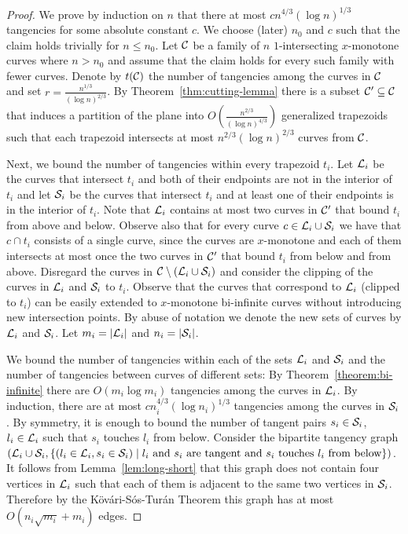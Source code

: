 \documentclass[11pt]{article}
\theoremstyle{definition}
\def\L{{\cal L}}
\def\C{{\cal C}}
\def\S{{\cal S}}
\begin{document}
\begin{proof}
We prove by induction on $n$ that there at most $c n^{4/3} (\log n)^{1/3}$ tangencies for some absolute constant $c$. 
We choose (later) $n_0$ and $c$ such that the claim holds trivially for $n \le n_0$.
Let $\C$ be a family of $n$ $1$-intersecting $x$-monotone curves where $n > n_0$ and assume that the claim holds for every such family with fewer curves.
Denote by $t(\C)$ the number of tangencies among the curves in $\C$
and set $r=\frac{n^{1/3}}{(\log n)^{2/3}}$.
By Theorem~\ref{thm:cutting-lemma} there is a subset $\C' \subseteq \C$ that induces a partition of the plane into $O\left(\frac{n^{2/3}}{(\log n)^{4/3}}\right)$ generalized trapezoids such that each trapezoid intersects at most $n^{2/3} (\log n)^{2/3}$ curves from $\C$.

Next, we bound the number of tangencies within every trapezoid $t_i$.
Let $\L_i$ be the curves that intersect $t_i$ and both of their endpoints are not in the interior of $t_i$ and let $\S_i$ be the curves that intersect $t_i$ and at least one of their endpoints is in the interior of $t_i$.
Note that $\L_i$ contains at most two curves in $\C'$ that bound $t_i$ from above and below.
Observe also that for every curve $c \in \L_i \cup \S_i$ we have that $c \cap t_i$ consists of a single curve, since the curves are $x$-monotone and each of them intersects at most once the two curves in $\C'$ that bound $t_i$ from below and from above.
Disregard the curves in $\C \setminus (\L_i \cup \S_i)$ and
consider the clipping of the curves in $\L_i$ and $\S_i$ to $t_i$. 
Observe that the curves that correspond to $\L_i$ (clipped to $t_i$) can be easily extended to $x$-monotone bi-infinite curves without introducing new intersection points.
By abuse of notation we denote the new sets of curves by $\L_i$ and $\S_i$.
Let $m_i = |\L_i|$ and $n_i = |\S_i|$.

We bound the number of tangencies within each of the sets $\L_i$ and $\S_i$ and the number of tangencies between curves of different sets:
By Theorem~\ref{theorem:bi-infinite} there are $O(m_i \log m_i)$ tangencies among the curves in $\L_i$.
By induction, there are at most $c n_i^{4/3} (\log n_i)^{1/3}$ tangencies among the curves in $\S_i$. 
By symmetry, it is enough to bound the number of tangent pairs $s_i \in \S_i$, $l_i \in \L_i$ such that $s_i$ touches $l_i$ from below. Consider the bipartite tangency graph $(\L_i \cup \S_i, \{(l_i\in\L_i,s_i\in\S_i) \mid \textrm{$l_i$ and $s_i$ are tangent and $s_i$ touches $l_i$ from below}\})$. 
It follows from Lemma~\ref{lem:long-short} that this graph does not contain four vertices in $\L_i$ such that each of them is adjacent to the same two vertices in $\S_i$. Therefore by the K\"ov\'ari-S\'os-Tur\'an Theorem this graph has at most $O(n_i\sqrt{m_i}+m_i)$ edges.


\end{proof}
\end{document}
